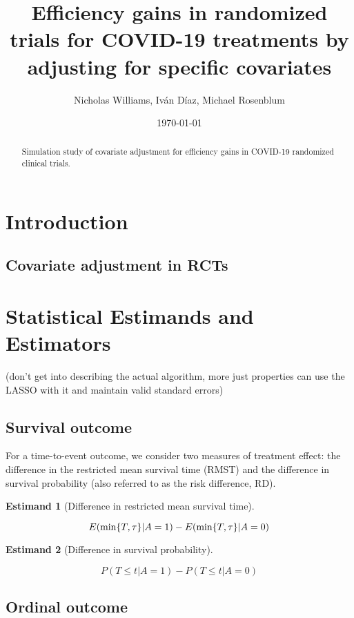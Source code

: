 \documentclass{article}
\title{
 {Efficiency gains in randomized trials for COVID-19 treatments by adjusting for specific covariates}\\
}
\author{Nicholas Williams, Iván Díaz, Michael Rosenblum}
\date{\today}
\begin{document}
\maketitle

\begin{abstract}
   Simulation study of covariate adjustment for efficiency gains in COVID-19 randomized clinical trials.
\end{abstract}

\section{Introduction}

\subsection{Covariate adjustment in RCTs}

\section{Statistical Estimands and Estimators}

(don't get into describing the actual algorithm, more just properties
can use the LASSO with it and maintain valid standard errors)

\subsection{Survival outcome}

\newtheorem{surv}{Estimand}

For a time-to-event outcome, we consider two measures of treatment effect: the difference in the restricted mean survival time (RMST) and the difference in survival probability (also referred to as the risk difference, RD). 

\begin{surv}[Difference in restricted mean survival time]
\label{rmst}
\end{surv}
\[E(\textnormal{min}\{T, \tau\} | A = 1) - E(\textnormal{min}\{T, \tau\} | A = 0)\]

\begin{surv}[Difference in survival probability]
\label{rmst}
\end{surv}
\[P(T \leq t | A = 1) - P(T \leq t | A = 0)\]

\subsection{Ordinal outcome}
\end{document}
